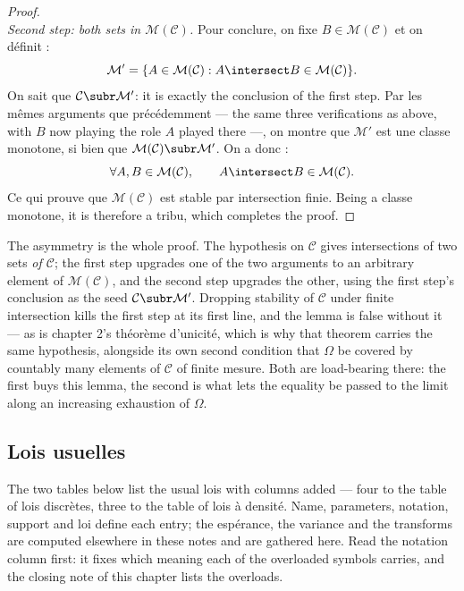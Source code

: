 \begin{proof}
\[  \]
  \emph{Second step: both sets in $\mathcal{M}(\mathcal{C})$.} Pour conclure, on
  fixe $B \in \mathcal{M}(\mathcal{C})$ et on définit :
  \[
    \mathcal{M}' = \{A \in \mathcal{M}(\mathcal{C}) :
      A \intersect B \in \mathcal{M}(\mathcal{C})\}.
  \]
  On sait que $\mathcal{C} \subr \mathcal{M}'$: it is exactly the conclusion of the
  first step. Par les mêmes arguments que précédemment --- the same three
  verifications as above, with $B$ now playing the role $A$ played there ---, on
  montre que $\mathcal{M}'$ est une classe monotone, si bien que
  $\mathcal{M}(\mathcal{C}) \subr \mathcal{M}'$. On a donc :
  \[
    \forall A, B \in \mathcal{M}(\mathcal{C}), \qquad
      A \intersect B \in \mathcal{M}(\mathcal{C}).
  \]
  Ce qui prouve que $\mathcal{M}(\mathcal{C})$ est stable par intersection finie.
  Being a classe monotone, it is therefore a tribu, which completes the proof.
\end{proof}

\begin{remark}
  The asymmetry is the whole proof. The hypothesis on $\mathcal{C}$ gives
  intersections of two sets \emph{of $\mathcal{C}$}; the first step upgrades one of
  the two arguments to an arbitrary element of $\mathcal{M}(\mathcal{C})$, and the
  second step upgrades the other, using the first step's conclusion as the seed
  $\mathcal{C} \subr \mathcal{M}'$. Dropping stability of $\mathcal{C}$ under finite
  intersection kills the first step at its first line, and the lemma is false
  without it --- as is chapter 2's théorème d'unicité, which is why that theorem
  carries the same hypothesis, alongside its own second condition that $\Omega$ be
  covered by countably many elements of $\mathcal{C}$ of finite mesure. Both are
  load-bearing there: the first buys this lemma, the second is what lets the
  equality be passed to the limit along an increasing exhaustion of $\Omega$.
\end{remark}

\subsection{Lois usuelles}
The two tables below list the usual lois with columns added --- four to the table
of lois discrètes, three to the table of lois à densité. Name, parameters,
notation, support and loi define each entry; the espérance, the variance and the
transforms are computed elsewhere in these notes and are gathered here. Read the
notation column first: it fixes which meaning each of the overloaded symbols
carries, and the closing note of this chapter lists the
overloads.

